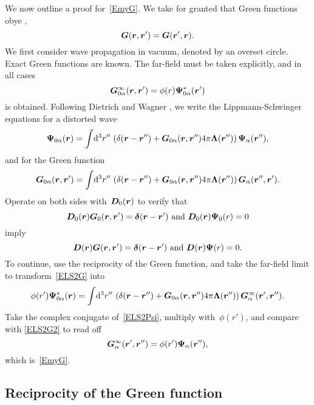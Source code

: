 We now outline a proof for~\cref{EmyG}.
We take for granted that Green functions obye  \cite{Pot04},
\begin{equation}
  \bm{G}(\bm{r},\bm{r}') = \bm{G}(\bm{r}',\bm{r}).
\end{equation}
We first consider wave propagation in vacuum,
denoted by an overset circle.
Exact Green functions
are known.
The far-field must be taken explicitly,
and in all cases
\begin{equation}
  \bm{G}_{0\alpha}^\infty(\bm{r},\bm{r}') = \phi(r)\bm{\Psi}_{0\alpha}^*(\bm{r}')
\end{equation}
is obtained.
Following Dietrich and Wagner \cite{DiWa84,DiWa85,DiWa16},
we write the Lippmann-Schwinger equations for a distorted wave
\begin{equation}\label{ELS2Psi}
   \bm{\Psi}_{0\alpha}(\bm{r})
   = \int\!\mathrm d^3r''\, \left( \delta(\bm{r}-\bm{r}'') + \bm{G}_{0\alpha}(\bm{r},\bm{r}'')4\pi\bm{\Lambda}(\bm{r}'') \right)
                     \bm{\Psi}_\alpha(\bm{r}''),
\end{equation}
and for the Green function
\begin{equation}\label{ELS2G}
   \bm{G}_{0\alpha}(\bm{r},\bm{r}')
   = \int\!\mathrm d^3r''\, \left( \delta(\bm{r}-\bm{r}'') + \bm{G}_{0\alpha}(\bm{r},\bm{r}'')4\pi\bm{\Lambda}(\bm{r}'') \right)
                     \bm{G}_\alpha(\bm{r}'',\bm{r}').
\end{equation}
Operate on both sides with~$\bm{D}_0(\bm{r})$ to verify that
\begin{equation}
  \bm{D}_0(\bm{r})\bm{G}_0(\bm{r},\bm{r}') = \bm{\delta}(\bm{r}-\bm{r}') \text{ and } \bm{D}_0(\bm{r})\bm{\Psi}_0(r)=0
\end{equation}
imply
\begin{equation}
  \bm{D}(\bm{r})\bm{G}(\bm{r},\bm{r}') = \bm{\delta}(\bm{r}-\bm{r}') \text{ and } \bm{D}(\bm{r})\bm{\Psi}(r)=0.
\end{equation}
To continue, use the reciprocity of the Green function,
and take the far-field limit to transform~\cref{ELS2G} into
\begin{equation}\label{ELS2G2}
   \phi(r')\bm{\Psi}_{0\alpha}^*(\bm{r})
   = \int\!\mathrm d^3r''\, \left( \delta(\bm{r}-\bm{r}'') + \bm{G}_{0\alpha}(\bm{r},\bm{r}'')4\pi\bm{\Lambda}(\bm{r}'') \right)
                     \bm{G}_\alpha^\infty(\bm{r}',\bm{r}'').
\end{equation}
Take the complex conjugate of~\cref{ELS2Psi},
multiply with~$\phi(r')$, and compare with \cref{ELS2G2}
to read off
\begin{equation}
   \bm{G}_\alpha^\infty(\bm{r}',\bm{r}'') = \phi(r')\bm{\Psi}_\alpha(\bm{r}''),
\end{equation}
which is~\cref{EmyG}.

\iffalse
\subsection{Reciprocity of the Green function}\label{SReci}

